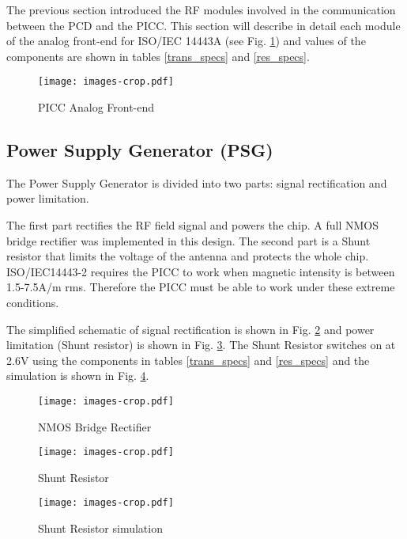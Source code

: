 The previous section introduced the RF modules involved in the communication between the PCD and the PICC. This section will describe in detail each module of the analog front-end for ISO/IEC 14443A (see Fig. \ref{fig:afe}) and values of the components are shown in tables \ref{trans_specs} and \ref{res_specs}.

\begin{figure}[]
  \centering
  \texttt{[image: images-crop.pdf]}
  \caption{PICC Analog Front-end}
  \label{fig:afe}
\end{figure}

\subsection{Power Supply Generator (PSG)}

The Power Supply Generator is divided into two parts: signal rectification and power limitation.

The first part rectifies the RF field signal and powers the chip. A full NMOS bridge rectifier \cite{rfid_rect}\cite{rfid_rect1}\cite{rfid_rect2} was implemented in this design. The second part is a Shunt resistor that limits the voltage of the antenna and protects the whole chip. ISO/IEC14443-2 requires the PICC to work when magnetic intensity is between 1.5-7.5A/m rms. Therefore the PICC must be able to work under these extreme conditions.  

The simplified schematic of signal rectification is shown in Fig. \ref{fig:rect} and power limitation (Shunt resistor) is shown in Fig. \ref{fig:shunt}. The Shunt Resistor switches on at 2.6V using the components in tables \ref{trans_specs} and \ref{res_specs} and the simulation is shown in Fig. \ref{fig:shunt_sim}.

\begin{figure}[h]
  \centering
  \texttt{[image: images-crop.pdf]}
  \caption{NMOS Bridge Rectifier}
  \label{fig:rect}
\end{figure}

\begin{figure}[h]
  \centering
  \texttt{[image: images-crop.pdf]}
  \caption{Shunt Resistor}
  \label{fig:shunt}
\end{figure}

\begin{figure}[h]
  \centering
  \texttt{[image: images-crop.pdf]}
  \caption{Shunt Resistor simulation}
  \label{fig:shunt_sim}
\end{figure}

